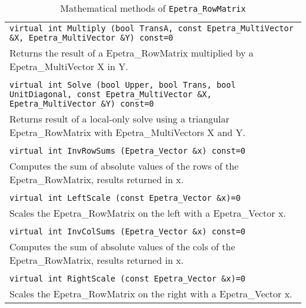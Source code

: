 \begin{table}
\begin{center}
\begin{tabular}{ | p{15cm} | }
\hline
\tt virtual int 
Multiply (bool TransA, const Epetra\_MultiVector \&X, Epetra\_MultiVector
\&Y) const=0 \\
Returns the result of a Epetra\_RowMatrix multiplied by a
Epetra\_MultiVector X in Y.  \\
\\
\tt virtual int 
Solve (bool Upper, bool Trans, bool UnitDiagonal, const
Epetra\_MultiVector \&X, Epetra\_MultiVector \&Y) const=0 \\
Returns result of a local-only solve using a triangular Epetra\_RowMatrix with Epetra\_MultiVectors X and Y. \\
\\
\tt virtual int 
InvRowSums (Epetra\_Vector \&x) const=0 \\
Computes the sum of absolute values of the rows of the Epetra\_RowMatrix,
results returned in x.  \\
\\
\tt virtual int 
LeftScale (const Epetra\_Vector \&x)=0 \\
Scales the Epetra\_RowMatrix on the left with a Epetra\_Vector x.  \\
\\
\tt virtual int 
InvColSums (Epetra\_Vector \&x) const=0 \\
Computes the sum of absolute values of the cols of the Epetra\_RowMatrix,
results returned in x.  \\
\\
\tt virtual int 
RightScale (const Epetra\_Vector \&x)=0 \\
Scales the Epetra\_RowMatrix on the right with a Epetra\_Vector x.  \\
\hline
\end{tabular}
\caption{Mathematical methods of {\tt Epetra\_RowMatrix}}
\label{tab:row_matrix_math}
\end{center}
\end{table}

